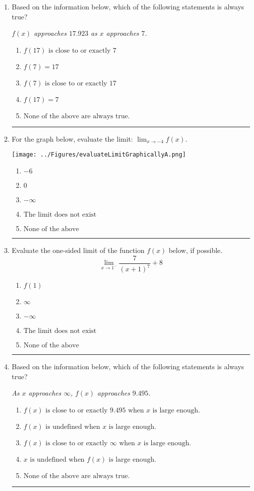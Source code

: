 \documentclass[14pt]{extbook}
\newcommand{\litem}[1]{\item#1\hspace*{-1cm}\rule{\textwidth}{0.4pt}}
\begin{document}
\begin{enumerate}
{\begin{enumerate}[label=\Alph*.]
\end{enumerate} }
\litem{
Based on the information below, which of the following statements is always true?
\begin{center}
    \textit{ $f(x)$ approaches $17.923$ as $x$ approaches $7$. }
\end{center}
\begin{enumerate}[label=\Alph*.]
\item \( f(17) \text{ is close to or exactly } 7 \)
\item \( f(7) = 17 \)
\item \( f(7) \text{ is close to or exactly } 17 \)
\item \( f(17) = 7 \)
\item \( \text{None of the above are always true.} \)

\end{enumerate} }
\litem{
For the graph below, evaluate the limit: $ \displaystyle \lim_{x \rightarrow -4} f(x)$.
\begin{center}
    \texttt{[image: ../Figures/evaluateLimitGraphicallyA.png]}
\end{center}
\begin{enumerate}[label=\Alph*.]
\item \( -6 \)
\item \( 0 \)
\item \( -\infty \)
\item \( \text{The limit does not exist} \)
\item \( \text{None of the above} \)

\end{enumerate} }
\litem{
Evaluate the one-sided limit of the function $f(x)$ below, if possible.\[ \lim_{x \rightarrow 1^-} \frac{7}{(x+1)^7}+8 \]\begin{enumerate}[label=\Alph*.]
\item \( f(1) \)
\item \( \infty \)
\item \( -\infty \)
\item \( \text{The limit does not exist} \)
\item \( \text{None of the above} \)

\end{enumerate} }
\litem{
Based on the information below, which of the following statements is always true?
\begin{center}
    \textit{ As $x$ approaches $\infty$, $f(x)$ approaches $9.495$. }
\end{center}
\begin{enumerate}[label=\Alph*.]
\item \( f(x) \text{ is close to or exactly } 9.495 \text{ when } x \text{ is large enough}. \)
\item \( f(x) \text{ is undefined when } x \text{ is large enough}. \)
\item \( f(x) \text{ is close to or exactly } \infty \text{ when } x \text{ is large enough}. \)
\item \( x \text{ is undefined when } f(x) \text{ is large enough}. \)
\item \( \text{None of the above are always true.} \)


\end{enumerate}}
\end{enumerate}
\end{document}
